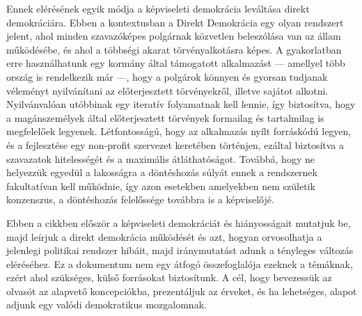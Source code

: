 Ennek elérésének egyik módja a képviseleti demokrácia leváltása direkt
demokráciára. Ebben a kontextusban a Direkt Demokrácia egy olyan rendszert jelent, ahol
minden szavazóképes polgárnak közvetlen beleszólása van az állam működésébe, és
ahol a többségi akarat törvényalkotásra képes. A gyakorlatban erre használhatunk egy
kormány által támogatott alkalmazást --- amellyel több ország is rendelkezik már ---,
hogy a polgárok könnyen és gyorsan tudjanak véleményt nyilvánítani az előterjesztett
törvényekről, illetve sajátot alkotni. Nyilvánvalóan utóbbinak egy iteratív folyamatnak
kell lennie, így biztosítva, hogy a magánszemélyek által előterjesztett törvények
formailag és tartalmilag is megfelelőek legyenek. Létfontosságú, hogy az alkalmazás nyílt
forráskódú legyen, és a fejlesztése egy non-profit szervezet keretében történjen, ezáltal
biztosítva a szavazatok hitelességét és a maximális átláthatóságot. Továbbá, hogy ne
helyezzük egyedül a lakosságra a döntéshozás súlyát ennek a rendszernek fakultatívan kell
működnie, így azon esetekben amelyekben nem születik konzenszus, a döntéshozás felelőssége
továbbra is a képviselőjé.

Ebben a cikkben először a képviseleti demokráciát és hiányosságait mutatjuk be, majd
leírjuk a direkt demokrácia működését és azt, hogyan orvosolhatja a jelenlegi politikai
rendszer hibáit, majd iránymutatást adunk a tényleges változás eléréséhez. Ez a
dokumentum nem egy átfogó összefoglalója ezeknek a témáknak, ezért ahol szükséges,
külső forrásokat biztosítunk. A cél, hogy bevezessük az olvasót az alapvető koncepciókba,
prezentáljuk az érveket, és ha lehetséges, alapot adjunk egy valódi demokratikus mozgalomnak.